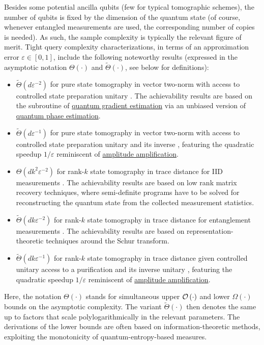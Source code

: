 \begin{refsection}
Besides some potential ancilla qubits (few for typical tomographic schemes), the number of qubits is fixed by the dimension of the quantum state (of course, whenever entangled measurements are used, the corresponding number of copies is needed). As such, the sample complexity is typically the relevant figure of merit. Tight query complexity characterizations, in terms of an approximation error $\varepsilon\in[0,1]$, include the following noteworthy results (expressed in the asymptotic notation $\Theta(\cdot)$ and $\widetilde{\Theta}(\cdot)$, see below for definitions):
\begin{itemize}
    \item $\widetilde{\Theta}(d\varepsilon^{-2})$ for pure state tomography in vector two-norm with access to controlled state preparation unitary \cite{kerenidis2018QIntPoint,apeldoorn2022TomographyStatePreparationUnitaries}. The achievability results are based on the subroutine of \hyperref[prim:GradientEstimation]{quantum gradient estimation} via an unbiased version of \hyperref[prim:QPE]{quantum phase estimation}.
    \item $\widetilde{\Theta}(d\varepsilon^{-1})$ for pure state tomography in vector two-norm with access to controlled state preparation unitary and its inverse \cite{apeldoorn2022TomographyStatePreparationUnitaries}, featuring the quadratic speedup $1/\varepsilon$ reminiscent of \hyperref[prim:AA]{amplitude amplification}.
    \item $\Theta(dk^2\varepsilon^{-2})$ for rank-$k$ state tomography in trace distance for IID measurements \cite{haah2017OptTomography,chen2022statetomoincoh,Gross2010tomography}. The achievability results are based on low rank matrix recovery techniques, where semi-definite programs have to be solved for reconstructing the quantum state from the collected measurement statistics.
    \item $\widetilde{\Theta}(dk\varepsilon^{-2})$ for rank-$k$ state tomography in trace distance for entanglement measurements \cite{odonnell2016EfficientQuantumTomography,haah2017OptTomography,Yuen2023improvedsample}. The achievability results are based on representation-theoretic techniques around the Schur transform.
    \item $\widetilde{\Theta}(dk\varepsilon^{-1})$ for rank-$k$ state tomography in trace distance given controlled unitary access to a purification and its inverse unitary \cite{apeldoorn2022TomographyStatePreparationUnitaries}, featuring the quadratic speedup $1/\varepsilon$ reminiscent of \hyperref[prim:AA]{amplitude amplification}.
\end{itemize}
Here, the notation $\Theta(\cdot)$ stands for simultaneous upper $\mathcal{O}\left( \cdot \right)$ and lower $\Omega(\cdot)$ bounds on the asymptotic complexity. The variant $\widetilde{\Theta}(\cdot)$ then denotes the same up to factors that scale polylogarithmically in the relevant parameters. The derivations of the lower bounds are often based on information-theoretic methods, exploiting the monotonicity of quantum-entropy-based measures.


\end{refsection}
